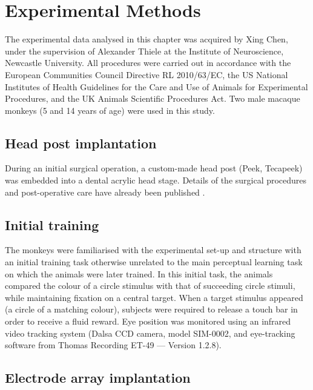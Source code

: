\section{Experimental Methods}
\label{ch:exp}

The experimental data analysed in this chapter was acquired by Xing Chen, under the supervision of Alexander Thiele at the Institute of Neuroscience, Newcastle University.
All procedures were carried out in accordance with the European Communities Council Directive RL 2010/63/EC, the US National Institutes of Health Guidelines for the Care and Use of Animals for Experimental Procedures, and the UK Animals Scientific Procedures Act. Two male macaque monkeys (5 and 14 years of age) were used in this study.


\subsection{Head post implantation}

During an initial surgical operation, a custom-made head post (Peek, Tecapeek) was embedded into a dental acrylic head stage.
Details of the surgical procedures and post-operative care have already been published \citep[see][]{Thiele2006}.


\subsection{Initial training}

The monkeys were familiarised with the experimental set-up and structure with an initial training task otherwise unrelated to the main perceptual learning task on which the animals were later trained.
In this initial task, the animals compared the colour of a circle stimulus with that of succeeding circle stimuli, while maintaining fixation on a central target.
When a target stimulus appeared (a circle of a matching colour), subjects were required to release a touch bar in order to receive a fluid reward.
Eye position was monitored using an infrared video tracking system (Dalsa CCD camera, model SIM-0002, and eye-tracking software from Thomas Recording ET-49 --- Version 1.2.8).


\subsection{Electrode array implantation}

